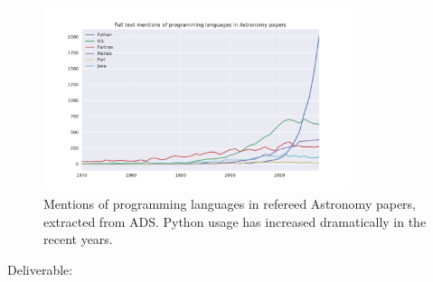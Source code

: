 \begin{task}[
  title=Astronomy application,
  id=astro,
  lead=CDS,
  PM=18,
  wphases={0-48},
  partners={QS,WTT,SRL}
]
\begin{figure}[ht]\centering
  \includegraphics[width=0.8\textwidth]{python-astro-citations}
  \caption{Mentions of programming languages in refereed Astronomy papers, extracted from ADS. Python usage has increased dramatically in the recent years.}\label{fig:python-astro-citations}
\end{figure}

Deliverable: 


\end{task}
